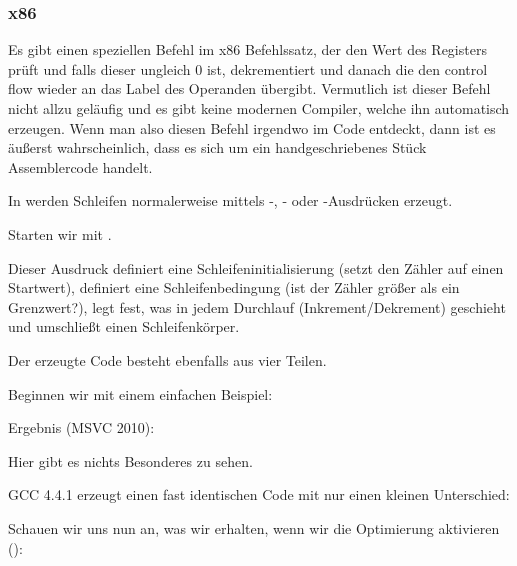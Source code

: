 \subsubsection{x86}

Es gibt einen speziellen \LOOP Befehl im x86 Befehlssatz, der den Wert des
Registers \ECX prüft und falls dieser ungleich 0 ist, dekrementiert und danach
die den control flow wieder an das Label des \LOOP Operanden übergibt.
Vermutlich ist dieser Befehl nicht allzu geläufig und es gibt keine modernen
Compiler, welche ihn automatisch erzeugen. Wenn man also diesen Befehl irgendwo
im Code entdeckt, dann ist es äußerst wahrscheinlich, dass es sich um ein
handgeschriebenes Stück Assemblercode handelt.

\par

In \CCpp werden Schleifen normalerweise mittels -, - oder
-Ausdrücken erzeugt.

Starten wir mit .


Dieser Ausdruck definiert eine Schleifeninitialisierung (setzt den Zähler auf
einen Startwert), definiert eine Schleifenbedingung (ist der Zähler größer als
ein Grenzwert?), legt fest, was in jedem Durchlauf
(\gls{Inkrement}/\gls{Dekrement}) geschieht und umschließt einen
Schleifenkörper.




Der erzeugte Code besteht ebenfalls aus vier Teilen.

Beginnen wir mit einem einfachen Beispiel:




Ergebnis (MSVC 2010):



Hier gibt es nichts Besonderes zu sehen.

GCC 4.4.1 erzeugt einen fast identischen Code mit nur einen kleinen Unterschied:



Schauen wir uns nun an, was wir erhalten, wenn wir die Optimierung aktivieren
(\TT{\Ox}):



